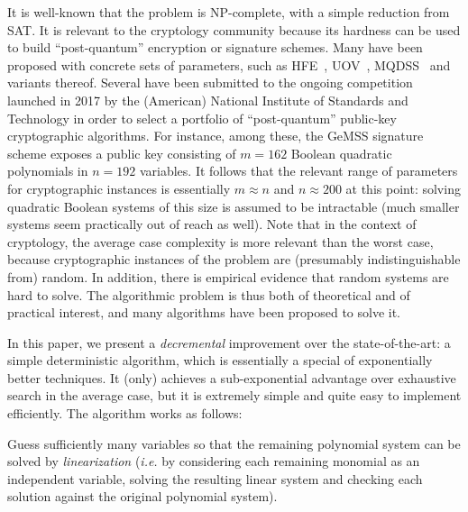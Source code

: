 \documentclass[a4paper,UKenglish,cleveref, autoref]{lipics-v2019}
\begin{document}

It is well-known that the problem is NP-complete, with a simple reduction from
SAT. It is relevant to the cryptology community because its hardness can be used
to build ``post-quantum'' encryption or signature schemes. Many have been
proposed with concrete sets of parameters, such as HFE~\cite{Patarin96},
UOV~\cite{KipnisPG99}, MQDSS~\cite{ChenHRSS16} and variants thereof. Several
have been submitted to the ongoing competition launched in 2017 by the
(American) National Institute of Standards and Technology in order to select a
portfolio of ``post-quantum'' public-key cryptographic algorithms. For instance,
among these, the \textsf{GeMSS} signature scheme exposes a public key consisting
of $m=162$ Boolean quadratic polynomials in $n=192$ variables. It follows that
the relevant range of parameters for cryptographic instances is essentially
$m \approx n$ and $n \approx 200$ at this point: solving quadratic Boolean
systems of this size is assumed to be intractable (much smaller systems seem
practically out of reach as well). Note that in the context of cryptology, the
average case complexity is more relevant than the worst case, because
cryptographic instances of the problem are (presumably indistinguishable from)
random. In addition, there is empirical evidence that random systems are hard to
solve. The algorithmic problem is thus both of theoretical and of practical
interest, and many algorithms have been proposed to solve it.

In this paper, we present a \emph{decremental} improvement over the
state-of-the-art: a simple deterministic algorithm, which is essentially a
special of exponentially better techniques. It (only) achieves a sub-exponential
advantage over exhaustive search in the average case, but it is extremely simple
and quite easy to implement efficiently. The algorithm works as follows:

\begin{framed}
  Guess sufficiently many variables so that the remaining polynomial system can
  be solved by \emph{linearization} (\textit{i.e.} by considering each remaining
  monomial as an independent variable, solving the resulting linear system and
  checking each solution against the original polynomial system).
\end{framed}
\end{document}
